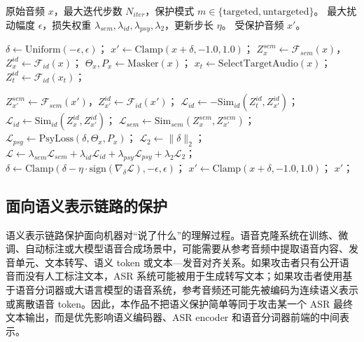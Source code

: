 \begin{algorithm}[H]
\caption{V-Guard 主动保护扰动生成算法}
\label{alg:vguard}
\small
\begin{algorithmic}[1]
    \Inputs 原始音频 $x$，最大迭代步数 $N_{iter}$，保护模式 $m \in \{\mathrm{targeted},\mathrm{untargeted}\}$。
    \Parameters 最大扰动幅度 $\epsilon$，损失权重 $\lambda_{sem}, \lambda_{id}, \lambda_{psy}, \lambda_{2}$，更新步长 $\eta$。
    \Output 受保护音频 $x'$。

    \State $\delta \gets \mathrm{Uniform}(-\epsilon, \epsilon)$；
    \State $x' \gets \mathrm{Clamp}(x + \delta, -1.0, 1.0)$；
    \State $Z_{x}^{sem} \gets \mathcal{F}_{sem}(x)$，$Z_{x}^{id} \gets \mathcal{F}_{id}(x)$；
    \State $\Theta_{x}, P_{x} \gets \mathrm{Masker}(x)$；
        \State $x_{t} \gets \mathrm{SelectTargetAudio}(x)$；
        \State $Z_{t}^{id} \gets \mathcal{F}_{id}(x_{t})$；
    \EndIf

        \State $Z_{x'}^{sem} \gets \mathcal{F}_{sem}(x')$，$Z_{x'}^{id} \gets \mathcal{F}_{id}(x')$；
            \State $\mathcal{L}_{id} \gets -\mathrm{Sim}_{id}\!\left(Z_{t}^{id}, Z_{x'}^{id}\right)$；
        \Else
            \State $\mathcal{L}_{id} \gets \mathrm{Sim}_{id}\!\left(Z_{x}^{id}, Z_{x'}^{id}\right)$；
        \EndIf
        \State $\mathcal{L}_{sem} \gets \mathrm{Sim}_{sem}\!\left(Z_{x}^{sem}, Z_{x'}^{sem}\right)$；
        \State $\mathcal{L}_{psy} \gets \mathrm{PsyLoss}\!\left(\delta, \Theta_{x}, P_{x}\right)$；
        \State $\mathcal{L}_{2} \gets \lVert \delta \rVert_{2}$；
        \State $\mathcal{L} \gets \lambda_{sem}\mathcal{L}_{sem}+\lambda_{id}\mathcal{L}_{id}+\lambda_{psy}\mathcal{L}_{psy}+\lambda_{2}\mathcal{L}_{2}$；
        \State $\delta \gets \mathrm{Clamp}\!\left(\delta-\eta\cdot\mathrm{sign}\left(\nabla_{\delta}\mathcal{L}\right), -\epsilon, \epsilon\right)$；
        \State $x' \gets \mathrm{Clamp}(x+\delta, -1.0, 1.0)$；
    \EndFor
    \State \Return $x'$；
\end{algorithmic}
\end{algorithm}

\subsection{面向语义表示链路的保护}\label{ux9762ux5411ux8bedux4e49ux8868ux793aux94feux8defux7684ux4fddux62a4}

语义表示链路保护面向机器对``说了什么''的理解过程。语音克隆系统在训练、微调、自动标注或大模型语音合成场景中，可能需要从参考音频中提取语音内容、发音单元、文本转写、语义
token
或文本---发音对齐关系。如果攻击者只有公开语音而没有人工标注文本，ASR
系统可能被用于生成转写文本；如果攻击者使用基于语音分词器或大语言模型的语音系统，参考音频还可能先被编码为连续语义表示或离散语音
token。因此，本作品不把语义保护简单等同于攻击某一个 ASR
最终文本输出，而是优先影响语义编码器、ASR encoder
和语音分词器前端的中间表示。

